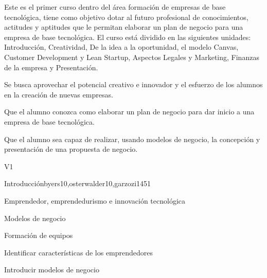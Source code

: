\begin{syllabus}


\begin{justification}
Este es el primer curso dentro del área formación de empresas de
base tecnológica, tiene como objetivo dotar al futuro profesional 
de conocimientos, actitudes y aptitudes que le
permitan elaborar un plan de negocio para una empresa de base tecnológica.
El curso está dividido en las siguientes unidades:
Introducción, Creatividad, De la idea a la oportunidad, el modelo Canvas, Customer Development y Lean Startup, Aspectos Legales y Marketing, Finanzas de la empresa y Presentación.

Se busca aprovechar el potencial creativo e innovador y el esfuerzo de los alumnos en la creación de nuevas empresas.
\end{justification}

\begin{goals}
\item Que el alumno conozca como elaborar un plan de negocio para dar inicio a una empresa de base tecnológica.
\item Que el alumno sea capaz de realizar, usando modelos de negocio, la concepción y presentación de una propuesta de negocio.
\end{goals}

\begin{outcomes}{V1}
\end{outcomes}

\begin{unit}{Introducción}{}{byers10,osterwalder10,garzozi14}{5}{1}
\begin{topics}
      \item Emprendedor, emprendedurismo e innovación tecnológica
      \item Modelos de negocio
      \item Formación de equipos
   \end{topics}

   \begin{learningoutcomes}
      \item Identificar características de los emprendedores
      \item Introducir modelos de negocio 
   \end{learningoutcomes}
\end{unit}


\end{syllabus}
